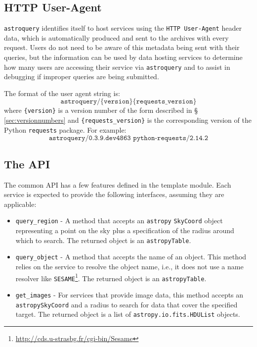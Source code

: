 \documentclass[twocolumn]{aastex62}
\newcommand{\package}[1]{\texttt{#1}\xspace}
\newcommand{\astroquery}{\package{astroquery}}
\newcommand{\astropypkg}{\package{astropy}}
\begin{document}
\subsection{HTTP User-Agent}
\label{sec:useragent}
\astroquery identifies itself to host services using the \texttt{HTTP
User-Agent} header data, which is automatically produced and sent to the
archives with every request.
Users do not need to be aware of this metadata being sent with their
queries, but the information can be used by data hosting services to determine
how many users are accessing their service via \astroquery and to assist in
debugging if improper queries are being submitted.

The format of the user agent string is:
\[\texttt{astroquery/\{version\} \{requests\_version\}}\] where
\texttt{\{version\}} is a version number of the form described in \S
\ref{sec:versionnumbers} and \texttt{\{requests\_version\}} is the
corresponding version of the Python \package{requests} package. For example:
\[\texttt{astroquery/0.3.9.dev4863 python-requests/2.14.2}\]


\subsection{The API}
The common API has a few features defined in the template module.
Each service is expected to provide the following interfaces, assuming they are
applicable:

\begin{itemize}
    \item \texttt{query\_region} - A method that accepts an \astropypkg
        \texttt{SkyCoord} object representing a point on the sky plus a
        specification of the radius around which to search.
        The returned object is an \astropypkg \texttt{Table}.
    \item \texttt{query\_object} - A method that accepts the name of an
        object.  This method relies on the service to resolve the object name, i.e., it does not use a name resolver
        like \texttt{SESAME}\footnote{\url{http://cds.u-strasbg.fr/cgi-bin/Sesame}}.
        The returned object is an \astropypkg \texttt{Table}.
    \item \texttt{get\_images} - For services that provide image data, this
        method accepts an \astropypkg \texttt{SkyCoord} and a radius to search for data
        that cover the specified target. The returned object is a list
        of \texttt{astropy.io.fits.HDUList} objects.

\end{itemize}
\end{document}
